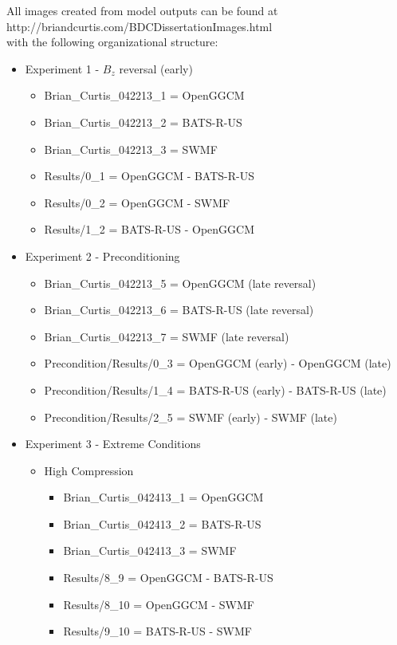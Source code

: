 All images created from model outputs can be found at\\
http://briandcurtis.com/BDCDissertationImages.html\\
with the following organizational structure:
\begin{itemize}
  \item Experiment 1 - $B_z$ reversal (early)
  \begin{itemize}
    \item Brian\_Curtis\_042213\_1 = OpenGGCM
    \item Brian\_Curtis\_042213\_2 = BATS-R-US
    \item Brian\_Curtis\_042213\_3 = SWMF
    \item Results/0\_1 = OpenGGCM - BATS-R-US
    \item Results/0\_2 = OpenGGCM - SWMF
    \item Results/1\_2 = BATS-R-US - OpenGGCM
  \end{itemize}
  \item Experiment 2 - Preconditioning
  \begin{itemize}
    \item Brian\_Curtis\_042213\_5 = OpenGGCM (late reversal)
    \item Brian\_Curtis\_042213\_6 = BATS-R-US (late reversal)
    \item Brian\_Curtis\_042213\_7 = SWMF (late reversal)
    \item Precondition/Results/0\_3 = OpenGGCM (early) - OpenGGCM (late)
    \item Precondition/Results/1\_4 = BATS-R-US (early) - BATS-R-US (late)
    \item Precondition/Results/2\_5 = SWMF (early) - SWMF (late)
  \end{itemize}
  \item Experiment 3 - Extreme Conditions
  \begin{itemize}
    \item High Compression
    \begin{itemize}
      \item Brian\_Curtis\_042413\_1 = OpenGGCM
      \item Brian\_Curtis\_042413\_2 = BATS-R-US
      \item Brian\_Curtis\_042413\_3 = SWMF
      \item Results/8\_9 = OpenGGCM - BATS-R-US
      \item Results/8\_10 = OpenGGCM - SWMF
      \item Results/9\_10 = BATS-R-US - SWMF

\end{itemize}
\end{itemize}
\end{itemize}
